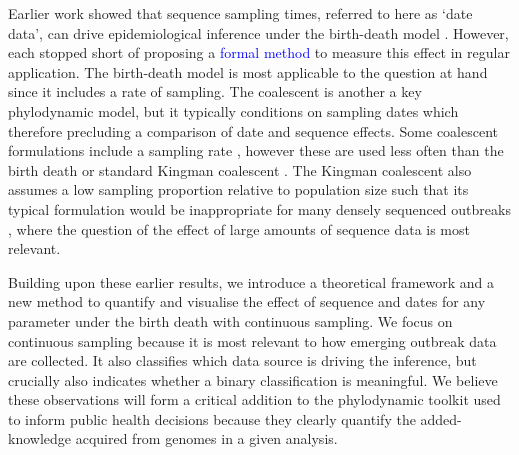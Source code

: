 \documentclass{article}
\begin{document}
Earlier work showed that sequence sampling times, referred to here as `date data', can drive epidemiological inference under the birth-death model \citep{volz_sampling_2014, boskova2018influence, Featherstone2021Infectious}. However, each stopped short of proposing a \textcolor{blue}{formal method} to measure this effect in regular application. The birth-death model is most applicable to the question at hand since it includes a rate of sampling. The coalescent is another a key phylodynamic model, but it typically conditions on sampling dates which therefore precluding a comparison of date and sequence effects. Some coalescent formulations include a sampling rate \citep{volz_sampling_2014}, however these are used less often than the birth death or standard Kingman coalescent \citep{kingman1977note}. The Kingman coalescent also assumes a low sampling proportion relative to population size such that its typical formulation would be inappropriate for many densely sequenced outbreaks \citep{boskova2018influence}, where the question of the effect of large amounts of sequence data is most relevant.

Building upon these earlier results, we introduce a theoretical framework and a new method to quantify and visualise the effect of sequence and dates for any parameter under the birth death with continuous sampling. We focus on continuous sampling because it is most relevant to how emerging outbreak data are collected. It also classifies which data source is driving the inference, but crucially also indicates whether  a binary classification is meaningful. We believe these observations will form a critical addition to the phylodynamic toolkit used to inform public health decisions because they clearly quantify the added-knowledge acquired from genomes in a given analysis.

\end{document}
